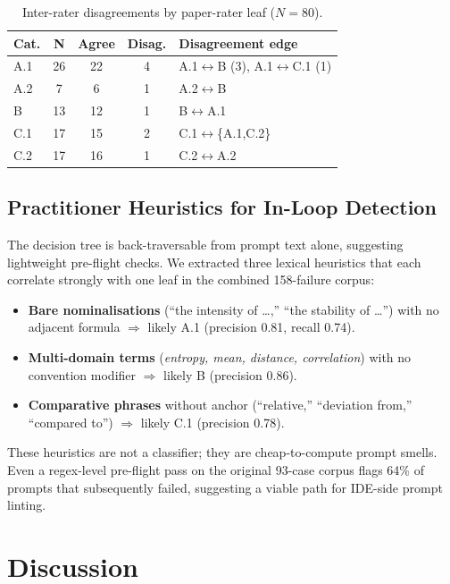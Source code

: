\documentclass[conference]{IEEEtran}
\begin{document}
\begin{table}[t]
\centering
\caption{Inter-rater disagreements by paper-rater leaf ($N{=}80$).}
\label{tab:disagreements}
\scriptsize
\setlength{\tabcolsep}{4pt}
\begin{tabular}{lcccl}
\toprule
Cat. & N & Agree & Disag. & Disagreement edge \\
\midrule
A.1 & 26 & 22 &  4 & A.1$\leftrightarrow$B (3), A.1$\leftrightarrow$C.1 (1) \\
A.2 &  7 &  6 &  1 & A.2$\leftrightarrow$B \\
B   & 13 & 12 &  1 & B$\leftrightarrow$A.1 \\
C.1 & 17 & 15 &  2 & C.1$\leftrightarrow$\{A.1,C.2\} \\
C.2 & 17 & 16 &  1 & C.2$\leftrightarrow$A.2 \\
\bottomrule
\end{tabular}
\end{table}

\subsection{Practitioner Heuristics for In-Loop Detection}
The decision tree is back-traversable from prompt text alone, suggesting lightweight pre-flight checks. We extracted three lexical heuristics that each correlate strongly with one leaf in the combined 158-failure corpus:
\begin{itemize}\itemsep1pt
  \item \textbf{Bare nominalisations} (``the intensity of \dots,'' ``the stability of \dots'') with no adjacent formula $\Rightarrow$ likely A.1 (precision 0.81, recall 0.74).
  \item \textbf{Multi-domain terms} (\emph{entropy, mean, distance, correlation}) with no convention modifier $\Rightarrow$ likely B (precision 0.86).
  \item \textbf{Comparative phrases} without anchor (``relative,'' ``deviation from,'' ``compared to'') $\Rightarrow$ likely C.1 (precision 0.78).
\end{itemize}
These heuristics are not a classifier; they are cheap-to-compute prompt smells. Even a regex-level pre-flight pass on the original 93-case corpus flags 64\% of prompts that subsequently failed, suggesting a viable path for IDE-side prompt linting.

\section{Discussion}\label{sec:discussion}
\end{document}
